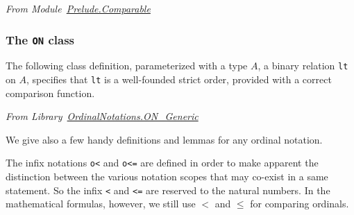 \emph{From Module~\href{../theories/html/hydras.Prelude/mparable.html\#Hvariant}{Prelude.Comparable}}







\subsubsection{The \texttt{ON} class}

The following class definition, parameterized with a type $A$, a binary relation \texttt{lt} on $A$, specifies that \texttt{lt} is a well-founded strict order, provided with a correct comparison function.


\vspace{4pt}
\noindent\emph{From
Library~\href{../theories/html/hydras.OrdinalNotations.ON_Generic.html}{OrdinalNotations.ON\_Generic}}

\label{types:ON}




We give  also a few handy definitions and lemmas for any ordinal notation.

\label{sect:on-lt-notation}
\label{sect:on-le-notation}
\label{sect:measure-ON}
\label{sect:bigO-ON}







\begin{remark}
The infix notations \texttt{o<} and \texttt{o<=} are defined in order to make apparent the distinction between the various notation scopes that may co-exist in a same statement. So the infix \texttt{<} and \texttt{<=} are reserved to the natural numbers. In the mathematical formulas, however, we still use $<$ and $\leq$ for comparing ordinals.
\end{remark}




